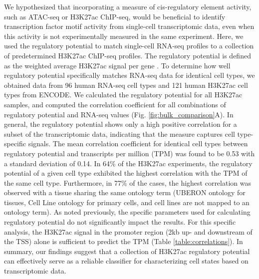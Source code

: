 We hypothesized that incorporating a measure of cis-regulatory element activity, such as ATAC-seq or H3K27ac ChIP-seq, would be beneficial to identify transcription factor motif activity from single-cell transcriptomic data, even when this activity is not experimentally measured in the same experiment. Here, we used the regulatory potential to match single-cell RNA-seq profiles to a collection of predetermined H3K27ac ChIP-seq profiles. The regulatory potential is defined as the weighted average H3K27ac signal per gene \cite{Wang2016}. To determine how well regulatory potential specifically matches RNA-seq data for identical cell types, we obtained data from 96 human RNA-seq cell types and 121 human H3K27ac cell types from ENCODE\cite{encode_dcc}. We calculated the regulatory potential for all H3K27ac samples, and computed the correlation coefficient for all combinations of regulatory potential and RNA-seq values (Fig. \ref{fig:bulk_comparison}A). In general, the regulatory potential shows only a high positive correlation for a subset of the transcriptomic data, indicating that the measure captures cell type-specific signals. The mean correlation coefficient for identical cell types between regulatory potential and transcripts per million (TPM) was found to be 0.53 with a standard deviation of 0.14. In 64\% of the H3K27ac experiments, the regulatory potential of a given cell type exhibited the highest correlation with the TPM of the same cell type. Furthermore, in 77\% of the cases, the highest correlation was observed with a tissue sharing the same ontology term (UBERON ontology for tissues, Cell Line ontology for primary cells, and cell lines are not mapped to an ontology term). As noted previously\cite{Wang2016}, the specific parameters used for calculating regulatory potential do not significantly impact the results. For this specific analysis, the H3K27ac signal in the promoter region (2kb up- and downstream of the TSS) alone is sufficient to predict the TPM (Table \ref{table:correlations}). In summary, our findings suggest that a collection of H3K27ac regulatory potential can effectively serve as a reliable classifier for characterizing cell states based on transcriptomic data.

